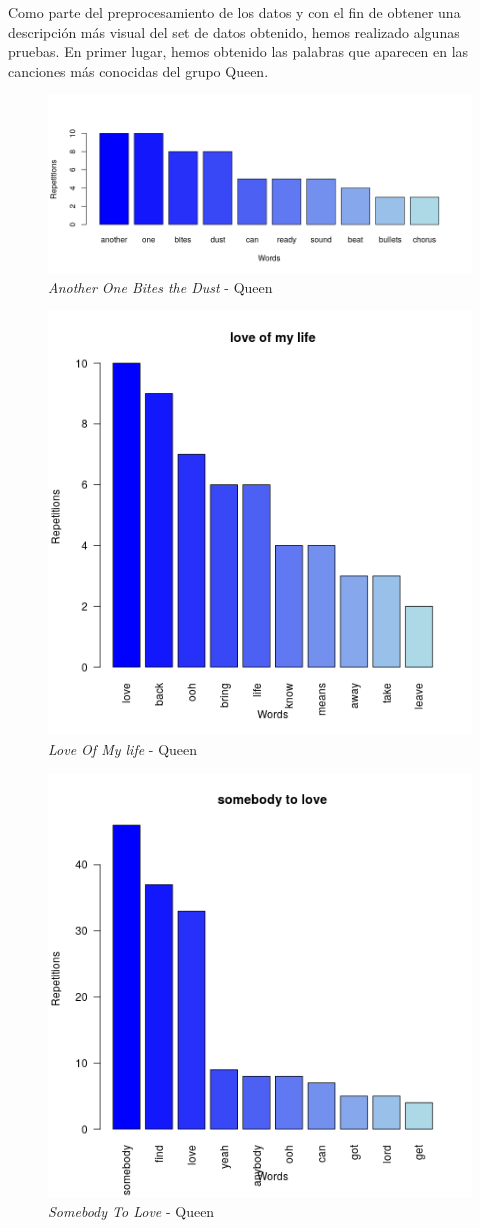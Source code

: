 Como parte del preprocesamiento de los datos y con el fin de obtener una descripción más visual del set de datos obtenido, hemos realizado algunas pruebas. En primer lugar, hemos obtenido las palabras que aparecen en las canciones más conocidas del grupo Queen.
\begin{figure}[h]
	\centering
	\includegraphics[width=0.7\linewidth]{Imagenes/AnotherOneBitesTheDust}
	\caption{\textit{Another One Bites the Dust} - Queen}
	\label{fig:AnotherOneBitesTheDust}
\end{figure}
\begin{figure}[h]
	\centering
	\includegraphics[width=0.7\linewidth]{Imagenes/loveofmylife}
	\caption{\textit{Love Of My life} - Queen}
	\label{fig:loveofmylife}
\end{figure}
\begin{figure}[h]
	\centering
	\includegraphics[width=0.7\linewidth]{Imagenes/somebodytolove}
	\caption{\textit{Somebody To Love} - Queen}
	\label{fig:sbtl}	
\end{figure}

